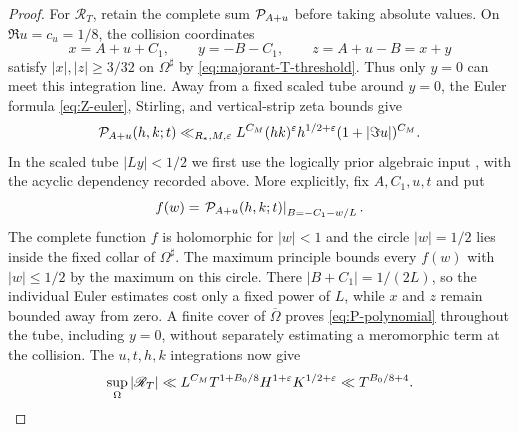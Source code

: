 \begin{proof}
For $\mathscr R_T$, retain the complete sum $\mathcal P_{A+u}$ before taking
absolute values.  On $\Re u=c_u=1/8$, the collision coordinates
\[
 x=A+u+C_1,\qquad y=-B-C_1,\qquad z=A+u-B=x+y
\]
satisfy $|x|,|z|\geq3/32$ on $\Omega^\sharp$ by
\eqref{eq:majorant-T-threshold}.  Thus only $y=0$ can meet this integration
line.  Away from a fixed scaled tube around $y=0$, the Euler formula
\eqref{eq:Z-euler}, Stirling, and vertical-strip zeta bounds give
\begin{equation}\label{eq:P-polynomial}
 \mathcal P_{A+u}(h,k;t)
 \ll_{R_*,M,\varepsilon}L^{C_M}(hk)^\varepsilon h^{1/2+\varepsilon}
 (1+|\Im u|)^{C_M}.
\end{equation}
In the scaled tube $|Ly|<1/2$ we first use the logically prior algebraic
input , with the acyclic dependency recorded above.
More explicitly, fix $A,C_1,u,t$ and put
\[
 f(w)=\left.\mathcal P_{A+u}(h,k;t)\right|_{B=-C_1-w/L}.
\]
The complete function $f$ is holomorphic for $|w|<1$ and the circle
$|w|=1/2$ lies inside the fixed collar of $\Omega^\sharp$.  The maximum
principle bounds every $f(w)$ with $|w|\leq1/2$ by the maximum on this
circle.  There
$|B+C_1|=1/(2L)$, so the individual Euler estimates cost only a fixed power
of $L$, while $x$ and $z$ remain bounded away from zero.  A finite cover of
$\overline\Omega$ proves \eqref{eq:P-polynomial} throughout the tube,
including $y=0$, without separately estimating a meromorphic term at the
collision.  The $u,t,h,k$ integrations now give
\begin{equation}\label{eq:R-T-polynomial}
 \sup_\Omega|\mathscr R_T|
 \ll L^{C_M}T^{1+B_0/8}H^{1+\varepsilon}K^{1/2+\varepsilon}
 \ll T^{B_0/8+4}.
\end{equation}


\end{proof}
